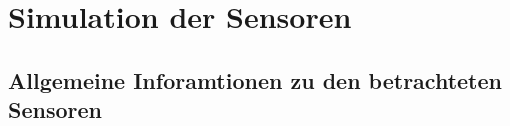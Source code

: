 \chapter{Simulation der Sensoren}



\section{Allgemeine Inforamtionen zu den betrachteten Sensoren}









